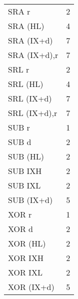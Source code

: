 \begin{ttfamily}
\begin{multicols}{3}
\begin{tabular}{lc}
SRA r       & 2 \\
SRA (HL)    & 4 \\
SRA (IX+d)    & 7 \\
SRA (IX+d),r   & 7 \\

SRL r       & 2 \\
SRL (HL)    & 4 \\
SRL (IX+d)    & 7 \\
SRL (IX+d),r   & 7 \\

SUB r         & 1 \\
SUB d         & 2 \\
SUB (HL) & 2\\
SUB IXH & 2 \\
SUB IXL & 2 \\
SUB (IX+d) & 5 \\

XOR r       & 1 \\
XOR d       & 2 \\
XOR (HL)    & 2 \\
XOR IXH     & 2 \\
XOR IXL     & 2 \\
XOR (IX+d)  & 5 \\

\end{tabular}



\end{multicols}
\end{ttfamily}

